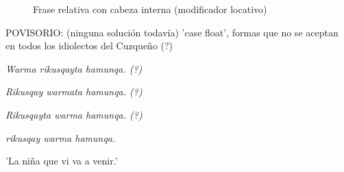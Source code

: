 \documentclass[a4paper,11pt,DIV12]{scrartcl}
\begin{document}
\begin{figure}

 \begin{center}
\end{center}
\caption{Frase relativa con cabeza interna (modificador locativo)}\label{Fig:relclauseIntHead2}
\end{figure}

POVISORIO: (ninguna soluci\'on todav\'ia) 'case float', formas que no se aceptan en todos los idiolectos del Cuzque\~no (?)
\begin{examples}
 \item {\em Warma rikusqayta hamunqa. (?)}
  \item {\em Rikusqay warmata hamunqa. (?)}
\item {\em Rikusqayta warma hamunqa. (?)}
\item {\em rikusqay warma hamunqa.}
\item[] 'La ni\~na que vi va a venir.'\\
 	\hfill{\small \citep[100]{Hastings04}}

\end{examples}
\end{document}
